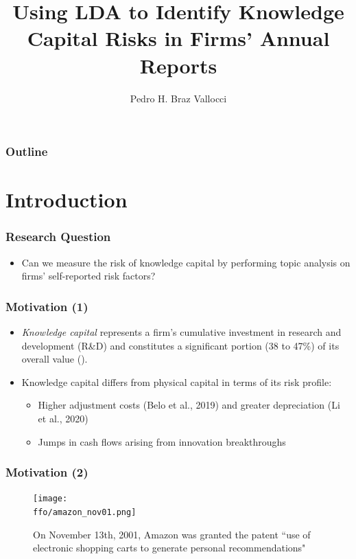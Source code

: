 \documentclass{beamer}
\title[] %
{Using LDA to Identify Knowledge Capital Risks in Firms' Annual Reports}
\author[Pedro Vallocci] %
{Pedro H. Braz Vallocci\inst{1}}
\institute[UCSC] %
{
  \inst{1}%
  University of California, Santa Cruz
 }
\newcommand{\ffo}{dicfullmc10thr10defnob40noa1_4t}
\begin{document}
\frame{\titlepage}

\begin{frame}
\frametitle{Outline}
\tableofcontents
\end{frame}

\section{Introduction}

\begin{frame}
\frametitle{Research Question}
\begin{itemize}
\item Can we measure the risk of knowledge capital by performing topic analysis on firms' self-reported risk factors?
\end{itemize}
\end{frame}

\begin{frame}\frametitle{Motivation (1)}
\begin{itemize}	
\item \textit{Knowledge capital} represents a firm's cumulative investment in research and development (R\&D) and constitutes a significant portion (38 to 47\%) of its overall value (\cite{Belo2019-iz}).
\item Knowledge capital differs from physical capital in terms of its risk profile:
\begin{itemize}
\item Higher adjustment costs (Belo et al., 2019) and greater depreciation (Li et al., 2020)
\item Jumps in cash flows arising from innovation breakthroughs \cite{Andrei2019-bh}
\end{itemize}
\end{itemize}
\end{frame}

\begin{frame}\frametitle{Motivation (2)}
\begin{figure}[h!]
  \centering
  \texttt{[image: \\ffo/amazon\_nov01.png]}
  \scriptsize
  \caption{On November 13th, 2001, Amazon was granted the patent ``use of electronic shopping carts to generate personal recommendations"}
  \label{data_steps}
\end{figure}
\end{frame}
\end{document}
